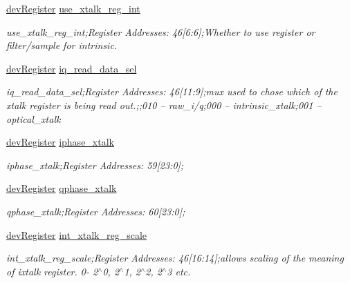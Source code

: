 \begin{DoxyCompactItemize}
\mbox{\hyperlink{classdev_register}{dev\+Register}} \mbox{\hyperlink{class_o_p_t3101_registers_a5cb06f9ac11c7f0772bae4e99139bf36}{use\+\_\+xtalk\+\_\+reg\+\_\+int}}
\begin{DoxyCompactList}\small\item\em use\+\_\+xtalk\+\_\+reg\+\_\+int;Register Addresses\+: 46\mbox{[}6\+:6\mbox{]};Whether to use register or filter/sample for intrinsic. \end{DoxyCompactList}\item 
\mbox{\hyperlink{classdev_register}{dev\+Register}} \mbox{\hyperlink{class_o_p_t3101_registers_a8e982a79b8a5b98ab4d5d3a81824fec3}{iq\+\_\+read\+\_\+data\+\_\+sel}}
\begin{DoxyCompactList}\small\item\em iq\+\_\+read\+\_\+data\+\_\+sel;Register Addresses\+: 46\mbox{[}11\+:9\mbox{]};mux used to chose which of the xtalk register is being read out.;;010 -- raw\+\_\+i/q;000 -- intrinsic\+\_\+xtalk;001 -- optical\+\_\+xtalk \end{DoxyCompactList}\item 
\mbox{\hyperlink{classdev_register}{dev\+Register}} \mbox{\hyperlink{class_o_p_t3101_registers_a0ae89b8b948bf035bfe7551a4701499b}{iphase\+\_\+xtalk}}
\begin{DoxyCompactList}\small\item\em iphase\+\_\+xtalk;Register Addresses\+: 59\mbox{[}23\+:0\mbox{]}; \end{DoxyCompactList}\item 
\mbox{\hyperlink{classdev_register}{dev\+Register}} \mbox{\hyperlink{class_o_p_t3101_registers_ad4347824ee5afdbdbe01e5043faca95c}{qphase\+\_\+xtalk}}
\begin{DoxyCompactList}\small\item\em qphase\+\_\+xtalk;Register Addresses\+: 60\mbox{[}23\+:0\mbox{]}; \end{DoxyCompactList}\item 
\mbox{\hyperlink{classdev_register}{dev\+Register}} \mbox{\hyperlink{class_o_p_t3101_registers_ab1fc1fee092157175f950f264117c425}{int\+\_\+xtalk\+\_\+reg\+\_\+scale}}
\begin{DoxyCompactList}\small\item\em int\+\_\+xtalk\+\_\+reg\+\_\+scale;Register Addresses\+: 46\mbox{[}16\+:14\mbox{]};allows scaling of the meaning of ixtalk register. 0-\/ 2$^\wedge$0, 2$^\wedge$1, 2$^\wedge$2, 2$^\wedge$3 etc. \end{DoxyCompactList}\item 

\end{DoxyCompactItemize}
